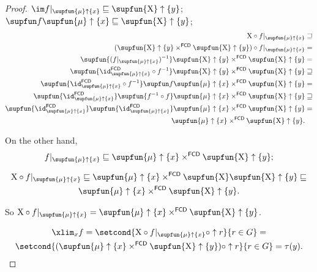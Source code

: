\begin{proof}
$\im f|_{\supfun{\mu}\uparrow\{x\}}\sqsubseteq\supfun{\mathrm{X}}\uparrow\{y\}$;
$\supfun f\supfun{\mu}\uparrow\{x\}\sqsubseteq\supfun{\mathrm{X}}\uparrow\{y\}$;
\begin{align*}
\mathrm{X}\circ f|_{\supfun{\mu}\uparrow\{x\}} & \sqsupseteq\\
(\supfun{\mathrm{X}}\uparrow\{y\}\times^{\mathsf{FCD}}\supfun{\mathrm{X}}\uparrow\{y\})\circ f|_{\supfun{\mu}\uparrow\{x\}} & =\\
\supfun{(f|_{\supfun{\mu}\uparrow\{x\}})^{-1}}\supfun{\mathrm{X}}\uparrow\{y\}\times^{\mathsf{FCD}}\supfun{\mathrm{X}}\uparrow\{y\} & =\\
\supfun{\id_{\supfun{\mu}\uparrow\{x\}}^{\mathsf{FCD}}\circ f^{-1}}\supfun{\mathrm{X}}\uparrow\{y\}\times^{\mathsf{FCD}}\supfun{\mathrm{X}}\uparrow\{y\} & \sqsupseteq\\
\supfun{\id_{\supfun{\mu}\uparrow\{x\}}^{\mathsf{FCD}}\circ f^{-1}}\supfun f\supfun{\mu}\uparrow\{x\}\times^{\mathsf{FCD}}\supfun{\mathrm{X}}\uparrow\{y\} & =\\
\supfun{\id_{\supfun{\mu}\uparrow\{x\}}^{\mathsf{FCD}}}\supfun{f^{-1}\circ f}\supfun{\mu}\uparrow\{x\}\times^{\mathsf{FCD}}\supfun{\mathrm{X}}\uparrow\{y\} & \sqsupseteq\\
\supfun{\id_{\supfun{\mu}\uparrow\{x\}}^{\mathsf{FCD}}}\supfun{\id_{\supfun{\mu}\uparrow\{x\}}^{\mathsf{FCD}}}\supfun{\mu}\uparrow\{x\}\times^{\mathsf{FCD}}\supfun{\mathrm{X}}\uparrow\{y\} & =\\
\supfun{\mu}\uparrow\{x\}\times^{\mathsf{FCD}}\supfun{\mathrm{X}}\uparrow\{y\}.
\end{align*}

On the other hand, \[ f|_{\supfun{\mu}\uparrow\{x\}}\sqsubseteq\supfun{\mu}\uparrow\{x\}\times^{\mathsf{FCD}}\supfun{\mathrm{X}}\uparrow\{y\}; \]

\begin{multline*}
\mathrm{X}\circ f|_{\supfun{\mu}\uparrow\{x\}}\sqsubseteq\supfun{\mu}\uparrow\{x\}\times^{\mathsf{FCD}}\supfun{\mathrm{X}}\supfun{\mathrm{X}}\uparrow\{y\}\sqsubseteq\\\supfun{\mu}\uparrow\{x\}\times^{\mathsf{FCD}}\supfun{\mathrm{X}}\uparrow\{y\}.
\end{multline*}

So $\mathrm{X}\circ f|_{\supfun{\mu}\uparrow\{x\}}=\supfun{\mu}\uparrow\{x\}\times^{\mathsf{FCD}}\supfun{\mathrm{X}}\uparrow\{y\}$.

\begin{multline*}
\xlim_{x}f=\setcond{\mathrm{X}\circ f|_{\supfun{\mu}\uparrow\{x\}}\circ\uparrow r}{r\in G}=\\ \setcond{(\supfun{\mu}\uparrow\{x\}\times^{\mathsf{FCD}}\supfun{\mathrm{X}}\uparrow\{y\})\circ\uparrow r}{r\in G}=\tau(y).
\end{multline*}
\end{proof}
